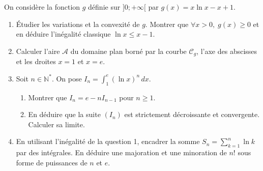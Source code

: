 \documentclass[11pt]{article}
\begin{document}
\begin{exercice}
On considère la fonction $g$ définie sur $]0; +\infty[$ par $g(x) = x\ln x - x + 1$.
\begin{enumerate}
    \item Étudier les variations et la convexité de $g$. Montrer que $\forall x > 0,\; g(x) \ge 0$ et en déduire l'inégalité classique $\ln x \le x - 1$.
    \item Calculer l'aire $\mathcal{A}$ du domaine plan borné par la courbe $\mathcal{C}_g$, l'axe des abscisses et les droites $x=1$ et $x=e$.
    \item Soit $n \in \mathbb{N}^*$. On pose $I_n = \displaystyle\int_1^e (\ln x)^n \, dx$.
    \begin{enumerate}
        \item Montrer que $I_n = e - n I_{n-1}$ pour $n \ge 1$.
        \item En déduire que la suite $(I_n)$ est strictement décroissante et convergente. Calculer sa limite.
    \end{enumerate}
    \item En utilisant l'inégalité de la question 1, encadrer la somme $S_n = \sum_{k=1}^n \ln k$ par des intégrales. En déduire une majoration et une minoration de $n!$ sous forme de puissances de $n$ et $e$.
\end{enumerate}
\end{exercice}
\end{document}
